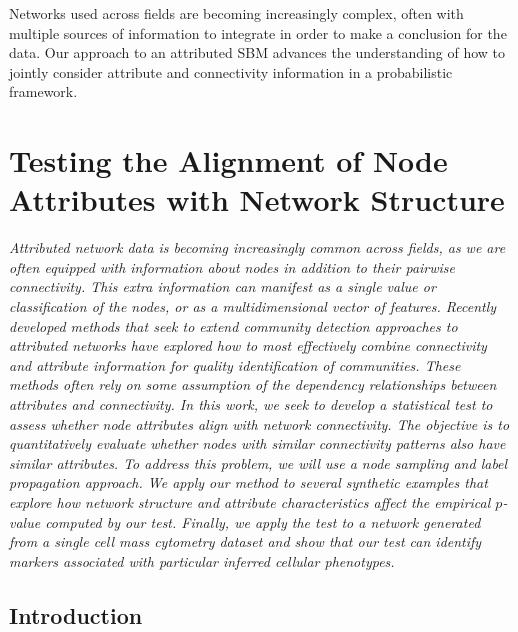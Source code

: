 Networks used across fields are becoming increasingly complex, often with multiple sources of information to integrate in order to make a conclusion for the data. Our approach to an attributed SBM advances the understanding of how to jointly consider attribute and connectivity information in a probabilistic framework. 

\chapter{Testing the Alignment of Node Attributes with Network Structure}

\emph{Attributed network data is becoming increasingly common across fields, as we are often equipped with information about nodes in addition to their pairwise connectivity. This extra information can manifest as a single value or classification of the nodes, or as a multidimensional vector of features. Recently developed methods that seek to extend community detection approaches to attributed networks have explored how to most effectively combine connectivity and attribute information for quality identification of communities. These methods often rely on some assumption of the dependency relationships between attributes and connectivity. In this work, we seek to develop a statistical test to assess whether node attributes align with network connectivity. The objective is to quantitatively evaluate whether nodes with similar connectivity patterns also have similar attributes. To address this problem, we will use a node sampling and label propagation approach. We apply our method to several synthetic examples that explore how network structure and attribute characteristics affect the empirical $p$-value computed by our test. Finally, we apply the test to a network generated from a single cell mass cytometry dataset and show that our test can identify markers associated with particular inferred cellular phenotypes. }

\section{Introduction}

